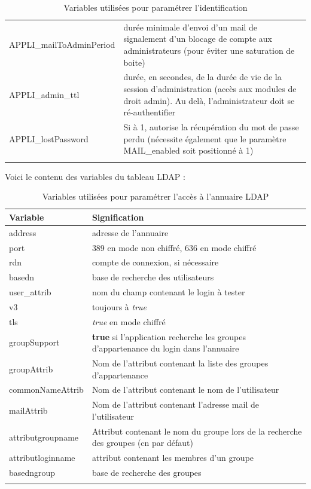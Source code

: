\begin{longtable}{|p{5cm}|p{8cm}|}
APPLI\_mailToAdminPeriod & durée minimale d'envoi d'un mail de signalement d'un blocage de compte aux administrateurs (pour éviter une saturation de boite) \\

APPLI\_admin\_ttl & durée, en secondes, de la durée de vie de la session d'administration (accès aux modules de droit admin). Au delà, l'administrateur doit se ré-authentifier \\

APPLI\_lostPassword & Si à 1, autorise la récupération du mot de passe perdu (nécessite également que le paramètre MAIL\_enabled soit positionné à 1) \\
\hline

\caption{Variables utilisées pour paramétrer l'identification}
\end{longtable}

Voici le contenu des variables du tableau LDAP : 
\begin{longtable}{|p{5cm}|p{8cm}|}
\hline
\textbf{Variable} & \textbf{Signification} \\
\hline
\endhead
address &  adresse de l'annuaire\\

port & 389 en mode non chiffré, 636 en mode chiffré\\

rdn & compte de connexion, si nécessaire \\

basedn & base de recherche des utilisateurs\\

user\_attrib & nom du champ contenant le login à tester\\

v3 & toujours à \textit{true}\\

tls & \textit{true} en mode chiffré\\

groupSupport & \textbf{true} si l'application recherche les groupes d'appartenance du login dans l'annuaire\\

groupAttrib & Nom de l'attribut contenant la liste des groupes d'appartenance\\

commonNameAttrib & Nom de l'attribut contenant le nom de l'utilisateur\\
\hline
mailAttrib & Nom de l'attribut contenant l'adresse mail de l'utilisateur\\

attributgroupname & Attribut contenant le nom du groupe lors de la recherche des groupes (cn par défaut)\\

attributloginname & attribut contenant les membres d'un groupe\\

basedngroup & base de recherche des groupes \\
\hline
\caption{Variables utilisées pour paramétrer l'accès à l'annuaire LDAP}
\end{longtable}

